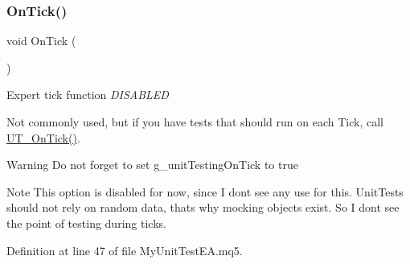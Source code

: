 \subsubsection{\texorpdfstring{On\+Tick()}{OnTick()}}
{\footnotesize\ttfamily void On\+Tick (\begin{DoxyParamCaption}{ }\end{DoxyParamCaption})}



Expert tick function {\itshape D\+I\+S\+A\+B\+L\+ED} 

Not commonly used, but if you have tests that should run on each Tick, call \mbox{\hyperlink{_m_t_unit_8mqh_afcdc18c227067029c1bb10f935bdb21c}{U\+T\+\_\+\+On\+Tick()}}. \begin{DoxyWarning}{Warning}
Do not forget to set g\+\_\+unit\+Testing\+On\+Tick to true 
\end{DoxyWarning}
\begin{DoxyNote}{Note}
This option is disabled for now, since I don\textquotesingle{}t see any use for this. Unit\+Tests should not rely on random data, that\textquotesingle{}s why mocking objects exist. So I don\textquotesingle{}t see the point of testing during ticks. 
\end{DoxyNote}


Definition at line 47 of file My\+Unit\+Test\+E\+A.\+mq5.

